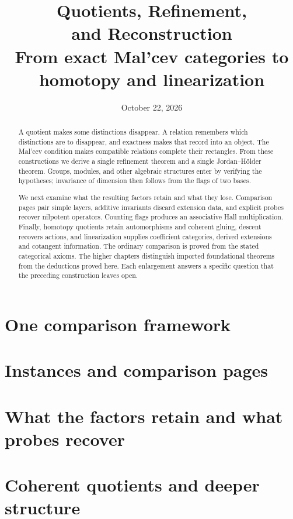 \documentclass[11pt]{article}
\title{\textbf{Quotients, Refinement,\\and Reconstruction}\\[9pt]\large From exact Mal'cev categories to homotopy and linearization}
\author{}\date{\small October 22, 2026}
\theoremstyle{definition}
\theoremstyle{remark}\newtheorem{remark}[theorem]{Remark}
\begin{document}
\maketitle\thispagestyle{empty}
\begin{abstract}
A quotient makes some distinctions disappear. A relation remembers which
distinctions are to disappear, and exactness makes that record into an
object. The Mal'cev condition makes compatible relations complete their
rectangles. From these constructions we derive a single refinement theorem
and a single Jordan--H\"older theorem. Groups, modules, and other algebraic
structures enter by verifying the hypotheses; invariance of dimension
then follows from the flags of two bases.

We next examine what the resulting factors retain and what they lose.
Comparison pages pair simple layers, additive invariants discard extension
data, and explicit probes recover nilpotent operators. Counting flags
produces an associative Hall multiplication. Finally, homotopy quotients
retain automorphisms and coherent gluing, descent recovers actions, and
linearization supplies coefficient categories, derived extensions and
cotangent information. The ordinary comparison is proved from the stated
categorical axioms. The higher chapters distinguish imported foundational
theorems from the deductions proved here. Each enlargement answers a
specific question that the preceding construction leaves open.
\end{abstract}
\clearpage
\clearpage\begingroup\setlength{\parskip}{0pt}\tableofcontents\endgroup
\clearpage\part{One comparison framework}



\clearpage\part{Instances and comparison pages}




\clearpage\part{What the factors retain and what probes recover}




\clearpage\part{Coherent quotients and deeper structure}


\clearpage\appendix
\end{document}

